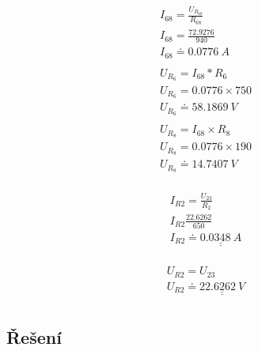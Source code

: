 \begin{figure}[t]
    \begin{gather*}
        I_{68} = \frac{U_{R_{68}}}{R_{68}} \\
        I_{68} = \frac{72.9276}{940} \\
        I_{68} \doteq 0.0776 \: A \\
        \\
        U_{R_6}= I_{68} * R_6 \\
        U_{R_6}= 0.0776 \times 750 \\
        U_{R_6} \doteq 58.1869 \: V \\
        \\
        U_{R_8} = I_{68} \times R_8 \\
        U_{R_8} = 0.0776 \times 190 \\
        U_{R_8} \doteq 14.7407 \: V \\
    \end{gather*}
\end{figure}

\begin{figure}[t]
    \begin{gather*}
        I_{R2} = \frac{U_{23}}{R_2} \\
        I_{R2}  \frac{22.6262}{650} \\
        I_{R2} \doteq \underline{\underline{0.0348 \: A}} \\
    \end{gather*}
\end{figure}

\begin{figure}[t]
    \begin{gather*}
        U_{R2} = U_{23} \\
        U_{R2} \doteq \underline{\underline{22.6262 \: V}} \\
    \end{gather*}
\end{figure}

\clearpage
\subsection{Řešení}

\clearpage